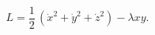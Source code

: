 \begin{equation}
L=\frac{1}{2}\,\left( \dot{x}^{2}+\dot{y}^{2}+\dot{z}^{2}\right) -\lambda xy.
\label{N=1}
\end{equation}

